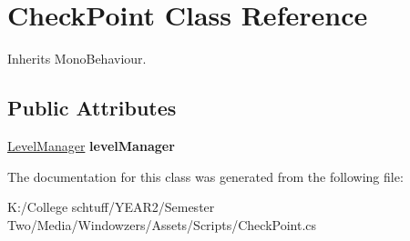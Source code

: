 \hypertarget{class_check_point}{}\section{Check\+Point Class Reference}
\label{class_check_point}


Inherits Mono\+Behaviour.

\subsection*{Public Attributes}
\begin{DoxyCompactItemize}
\item 
\mbox{\label{class_check_point_a66786a296a2f99eaf208a79229ba6ab5}} 
\hyperlink{class_level_manager}{Level\+Manager} {\bfseries level\+Manager}
\end{DoxyCompactItemize}


The documentation for this class was generated from the following file\+:\begin{DoxyCompactItemize}
\item 
K\+:/\+College schtuff/\+Y\+E\+A\+R2/\+Semester Two/\+Media/\+Windowzers/\+Assets/\+Scripts/Check\+Point.\+cs\end{DoxyCompactItemize}

